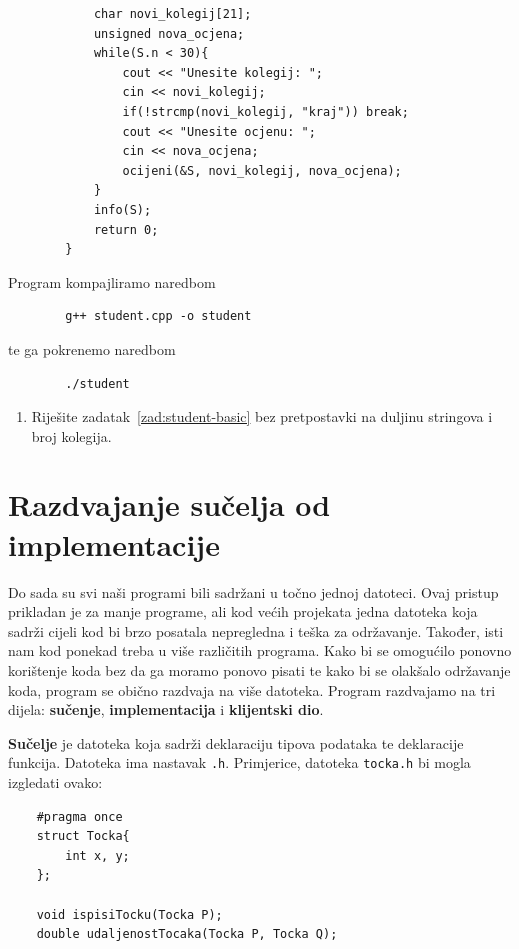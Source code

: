 \begin{rjesenje}
\begin{verbatim}
            char novi_kolegij[21];
            unsigned nova_ocjena;
            while(S.n < 30){
                cout << "Unesite kolegij: ";
                cin << novi_kolegij;
                if(!strcmp(novi_kolegij, "kraj")) break;
                cout << "Unesite ocjenu: ";
                cin << nova_ocjena;
                ocijeni(&S, novi_kolegij, nova_ocjena); 
            }   
            info(S);
            return 0;
        }
    \end{verbatim}
    Program kompajliramo naredbom
    \begin{verbatim}
        g++ student.cpp -o student    
    \end{verbatim}
    te ga pokrenemo naredbom
    \begin{verbatim}
        ./student
    \end{verbatim}
\end{rjesenje}

\begin{razmisljanje}
    \begin{enumerate}
        \item Riješite zadatak~\ref{zad:student-basic} bez pretpostavki na duljinu stringova i broj kolegija.
    \end{enumerate}
\end{razmisljanje}

\section{Razdvajanje sučelja od implementacije}
Do sada su svi naši programi bili sadržani u točno jednoj datoteci. Ovaj pristup prikladan je za manje programe, ali kod većih projekata jedna datoteka koja sadrži cijeli kod bi brzo posatala nepregledna i teška za održavanje.
Također, isti nam kod ponekad treba u više različitih programa. Kako bi se omogućilo ponovno korištenje koda bez da ga moramo ponovo pisati te kako bi se olakšalo održavanje koda, program se obično razdvaja na više datoteka.
Program razdvajamo na tri dijela: \textbf{sučenje}, \textbf{implementacija} i \textbf{klijentski dio}.
\medskip

\textbf{Sučelje} je datoteka koja sadrži deklaraciju tipova podataka te deklaracije funkcija. Datoteka ima nastavak \texttt{.h}. Primjerice, datoteka \texttt{tocka.h} bi mogla izgledati ovako:
\begin{verbatim}
    #pragma once
    struct Tocka{
        int x, y;
    };

    void ispisiTocku(Tocka P);
    double udaljenostTocaka(Tocka P, Tocka Q);
\end{verbatim}

